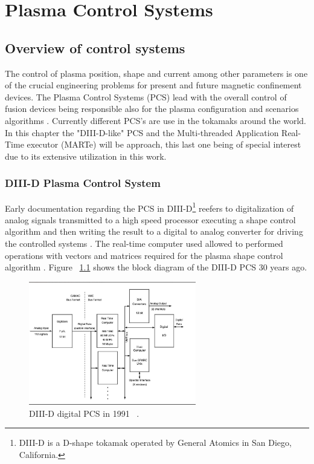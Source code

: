 \chapter{Plasma Control Systems}

\section{Overview of control systems}
The control of  plasma position, shape and current among other parameters is one of the crucial engineering problems for present and future magnetic confinement devices. The Plasma Control Systems (PCS) lead with the overall control of  fusion devices being responsible also for the  plasma configuration and scenarios algorithms \cite[Chapter~8]{PCS_2018}. Currently different PCS's are use in the tokamaks around the world. In this chapter the "DIII-D-like" PCS and the Multi-threaded Application Real-Time executor (MARTe) will be approach, this last one being of special interest due to its extensive utilization in this work.

\subsection{DIII-D Plasma Control System}  

Early documentation regarding the PCS in DIII-D\footnote{DIII-D is a D-shape tokamak operated by General Atomics in San Diego, California. } reefers to digitalization of analog signals transmitted to a high speed processor executing a shape control algorithm and then writing the result to a digital to analog converter for driving the controlled systems . The real-time computer used allowed to performed operations with vectors and matrices required for the plasma shape control algorithm \cite{DIIDcontrol}. Figure ~\ref{DIII1991} shows the block diagram of the DIII-D PCS 30 years ago.

\begin{figure}[htbp]
	\centering
	\includegraphics[width=0.65\textwidth]{Chp2/DIIDPCS_old}
	\caption{\label{DIII1991} DIII-D digital PCS in 1991 ~\cite{DIIDcontrol}.  }
\end{figure}


